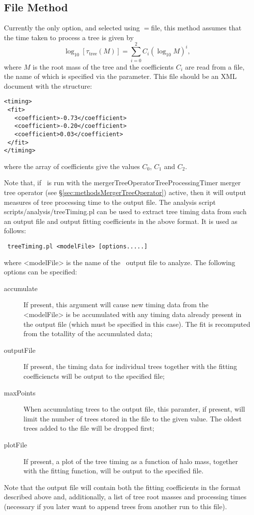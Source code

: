 \subsection{File Method}

Currently the only option, and selected using {\normalfont \ttfamily [timePerTreeMethod]}$=${\normalfont \ttfamily file}, this method assumes that the time taken to process a tree is given by
\begin{equation}
 \log_{10} [ \tau_\mathrm{tree}(M)] = \sum_{i=0}^2 C_i (\log_{10} M)^i,
\end{equation}
where $M$ is the root mass of the tree and the coefficients $C_i$ are read from a file, the name of which is specified via the {\normalfont \ttfamily [timePerTreeFitFileName]} parameter. This file should be an XML document with the structure:
\begin{verbatim}
<timing>
 <fit>
   <coefficient>-0.73</coefficient>
   <coefficient>-0.20</coefficient>
   <coefficient>0.03</coefficient>
 </fit>
</timing>
\end{verbatim}
where the array of coefficients give the values $C_0$, $C_1$ and $C_2$.

Note that, if \glc\ is run with the {\normalfont \ttfamily mergerTreeOperatorTreeProcessingTimer} merger tree operator (see \S\ref{sec:methodsMergerTreeOperator}) active, then it will output measures of tree processing time to the output file. The analysis script {\normalfont \ttfamily scripts/analysis/treeTiming.pl} can be used to extract tree timing data from such an output file and output fitting coefficients in the above format. It is used as follows:
\begin{verbatim}
 treeTiming.pl <modelFile> [options.....]
\end{verbatim}
where {\normalfont \ttfamily <modelFile>} is the name of the \glc\ output file to analyze. The following options can be specified:
\begin{description}
 \item [{\normalfont \ttfamily accumulate}] If present, this argument will cause new timing data from the {\normalfont \ttfamily <modelFile>} is be accumulated with any timing data already present in the output file (which must be specified in this case). The fit is recomputed from the totallity of the accumulated data;
 \item [{\normalfont \ttfamily outputFile}] If present, the timing data for individual trees together with the fitting coefficiencts will be output to the specified file;
 \item [{\normalfont \ttfamily maxPoints}] When accumulating trees to the output file, this paramter, if present, will limit the number of trees stored in the file to the given value. The oldest trees added to the file will be dropped first;
 \item [{\normalfont \ttfamily plotFile}] If present, a plot of the tree timing as a function of halo mass, together with the fitting function, will be output to the specified file.
\end{description}
Note that the output file will contain both the fitting coefficients in the format described above and, additionally, a list of tree root masses and processing times (necessary if you later want to append trees from another run to this file).
